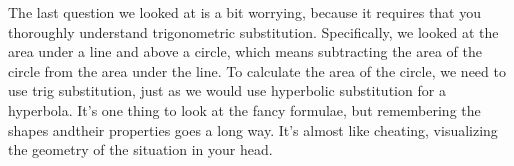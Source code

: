 \documentclass{article}
\begin{document}
The last question we looked at is a bit worrying, because it requires that you thoroughly understand trigonometric substitution. Specifically, we looked at the area under a line and above a circle, which means subtracting the area of the circle from the area under the line. To calculate the area of the circle, we need to use trig substitution, just as we would use hyperbolic substitution for a hyperbola. It's one thing to look at the fancy formulae, but remembering the shapes andtheir properties goes a long way. It's almost like cheating, visualizing the geometry of the situation in your head.
\end{document}
